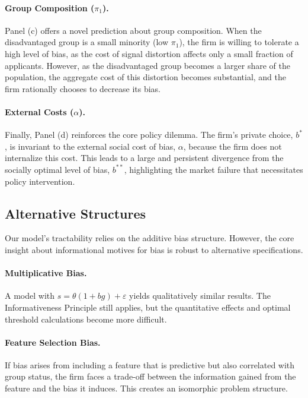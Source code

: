 \documentclass[12pt,a4paper]{article}
\theoremstyle{definition}
\theoremstyle{remark}
\begin{document}
\paragraph{Group Composition ($\pi_1$).} Panel (c) offers a novel prediction about group composition. When the disadvantaged group is a small minority (low $\pi_1$), the firm is willing to tolerate a high level of bias, as the cost of signal distortion affects only a small fraction of applicants. However, as the disadvantaged group becomes a larger share of the population, the aggregate cost of this distortion becomes substantial, and the firm rationally chooses to decrease its bias.

\paragraph{External Costs ($\alpha$).} Finally, Panel (d) reinforces the core policy dilemma. The firm's private choice, $b^*$, is invariant to the external social cost of bias, $\alpha$, because the firm does not internalize this cost. This leads to a large and persistent divergence from the socially optimal level of bias, $b^{**}$, highlighting the market failure that necessitates policy intervention.

\subsection{Alternative Structures}
Our model's tractability relies on the additive bias structure. However, the core insight about informational motives for bias is robust to alternative specifications.

\paragraph{Multiplicative Bias.} A model with $s = \theta(1+bg) + \varepsilon$ yields qualitatively similar results. The Informativeness Principle still applies, but the quantitative effects and optimal threshold calculations become more difficult.

\paragraph{Feature Selection Bias.} If bias arises from including a feature that is predictive but also correlated with group status, the firm faces a trade-off between the information gained from the feature and the bias it induces. This creates an isomorphic problem structure.
\end{document}
